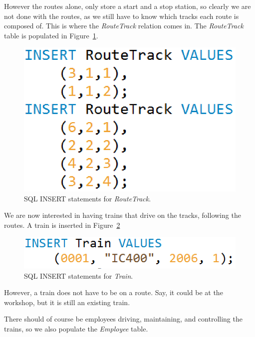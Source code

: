 However the routes alone, only store a start and a stop station, so clearly we 
are not done with the routes, as we still have to know which tracks each route 
is composed of. This is where the \emph{RouteTrack} relation comes in. The 
\emph{RouteTrack} table is populated in Figure~\ref{fig:ins:routetrack}.

\begin{figure}[ht!]
    \centering
    \includegraphics[scale=.5]{img/INSERT_Statements_RouteTrack}
    \caption{SQL INSERT statements for \emph{RouteTrack}.}
    \label{fig:ins:routetrack}
\end{figure}

We are now interested in having trains that drive on the tracks, following the 
routes. A train is inserted in Figure~\ref{fig:ins:train}

\begin{figure}[ht!]
    \centering
    \includegraphics[scale=.5]{img/INSERT_Statements_Train}
    \caption{SQL INSERT statements for \emph{Train}.}
    \label{fig:ins:train}
\end{figure}

However, a train does not have to be on a route. Say, it could be at the 
workshop, but it is still an existing train.

There should of course be employees driving, maintaining, and controlling the 
trains, so we also populate the \emph{Employee} table.

